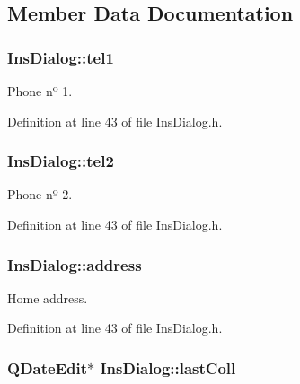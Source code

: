 \subsection{Member Data Documentation}
\hypertarget{class_ins_dialog_a7dc562149fa67417983c78fe2621d7f9}{
\subsubsection[{tel1}]{\setlength{\rightskip}{0pt plus 5cm}Ins\+Dialog\+::tel1\hspace{0.3cm}{\ttfamily [private]}}}\label{class_ins_dialog_a7dc562149fa67417983c78fe2621d7f9}


Phone nº 1. 



Definition at line 43 of file Ins\+Dialog.\+h.

\hypertarget{class_ins_dialog_a79832ba6767602ed1d07b9b707bbfd1f}{
\subsubsection[{tel2}]{\setlength{\rightskip}{0pt plus 5cm}Ins\+Dialog\+::tel2\hspace{0.3cm}{\ttfamily [private]}}}\label{class_ins_dialog_a79832ba6767602ed1d07b9b707bbfd1f}


Phone nº 2. 



Definition at line 43 of file Ins\+Dialog.\+h.

\hypertarget{class_ins_dialog_a14da50d5cdf18e266b1d198ebbd20770}{
\subsubsection[{address}]{\setlength{\rightskip}{0pt plus 5cm}Ins\+Dialog\+::address\hspace{0.3cm}{\ttfamily [private]}}}\label{class_ins_dialog_a14da50d5cdf18e266b1d198ebbd20770}


Home address. 



Definition at line 43 of file Ins\+Dialog.\+h.

\hypertarget{class_ins_dialog_a945a99c1652d647dbab8dc25df556828}{
\subsubsection[{last\+Coll}]{\setlength{\rightskip}{0pt plus 5cm}Q\+Date\+Edit$\ast$ Ins\+Dialog\+::last\+Coll\hspace{0.3cm}{\ttfamily [private]}}}\label{class_ins_dialog_a945a99c1652d647dbab8dc25df556828}


